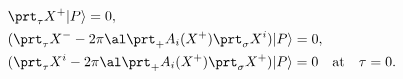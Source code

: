 \begin{equation}
\begin{split}
&\prt_\tau X^+|P\rangle=0,\\
&(\prt_\tau X^- -2\pi \al \prt_+ A_i(X^+)\prt_\sigma X^i)|P\rangle=0,\\
&(\prt_\tau X^i -2\pi \al \prt_+ A_i(X^+)\prt_\sigma X^+)|P\rangle=0
\quad \mbox{at} \quad \tau=0.
\end{split}
\end{equation}

